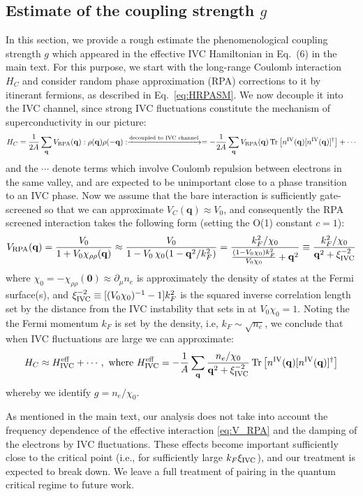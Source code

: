 \documentclass[aps,pra,twocolumn,superscriptaddress,10pt,article,nofootinbib,showpacs,longbibliography]{revtex4-1}
\def \q{{\mathbf q}}
\def \beq{\begin{eqnarray}}
\def \eeq{\end{eqnarray}}
\begin{document}
\subsection{Estimate of the coupling strength $g$}
In this section, we provide a rough estimate the phenomenological coupling strength $g$ which appeared in the effective IVC Hamiltonian in Eq.~(6) in the main text.
For this purpose, we start with the long-range Coulomb interaction $H_C$ and consider random phase approximation (RPA) corrections to it by itinerant fermions, as described in Eq.~\eqref{eq:HRPASM}.
We now decouple it into the IVC channel, since strong IVC fluctuations constitute the mechanism of superconductivity in our picture:
\beq
H_{C} = \frac{1}{2A} \sum_\q V_{\rm RPA}(\q) :\rho(\q) \rho(-\q):  \xrightarrow{\text{decoupled to IVC channel}}  = -\frac{1}{2A} \sum_\q V_{\rm RPA}(\q)  \Tr\left[ n^{\rm IV}(\q) [n^{\rm IV}(\q)]^\dagger \right] + \cdots
\eeq
and the $\cdots$ denote terms which involve Coulomb repulsion between electrons in the same valley, and are expected to be unimportant close to a phase transition to an IVC phase. 
Now we assume that the bare interaction is sufficiently gate-screened so that we can approximate $V_C(\q) \approx V_0$, and consequently the RPA screened interaction takes the following form (setting the O(1) constant $c=1$):
\beq
V_{\rm RPA}(\q)= \frac{V_0}{1 + V_0 \chi_{\rho \rho}(\q)} \approx \frac{V_0}{1 - V_0 \, \chi_0(1 - \q^2/k_F^2)} = \frac{k_F^2/\chi_0}{\frac{(1 - V_0 \chi_0)k_F^2}{V_0 \chi_0} + \q^2} \equiv \frac{k_F^2/\chi_0}{\q^2 + \xi_{\rm{IVC}}^{-2}}
\label{eq:V_RPA}
\eeq
where $\chi_0 = - \chi_{\rho \rho}(\bm{0}) \approx \partial_\mu n_e$ is approximately the density of states at the Fermi surface(s), and  $\xi_{\rm{IVC}}^{-2} \equiv [(V_0 \chi_0)^{-1} - 1]k_F^2$ is the squared inverse correlation length set by the distance from the IVC instability that sets in at $V_0 \chi_0 = 1$.
Noting the the Fermi momentum $k_F$ is set by the density, i.e, $k_F \sim \sqrt{n_e}$, we conclude that when IVC fluctuations are large we can approximate:
\beq
H_{C} \approx H^{\rm eff}_{\rm IVC} + \cdots, \text{ where }  H^{\rm eff}_{\rm IVC} = - \frac{1}{A} \sum_\q \frac{n_e/\chi_0}{\q^2 + \xi_{\rm{IVC}}^{-2}}  \Tr\left[ n^{\rm IV}(\q) [n^{\rm IV}(\q)]^\dagger \right]
\eeq
whereby we identify $g = n_e/\chi_0$.

As mentioned in the main text, our analysis does not take into account the frequency dependence of the effective interaction \eqref{eq:V_RPA} and the damping of the electrons by IVC fluctuations. These effects become important sufficiently close to the critical point \cite{abanov2001coherent} (i.e., for sufficiently large $k_F\xi_{\rm{IVC}}$), and our treatment is expected to break down. We leave a full treatment of pairing in the quantum critical regime to future work.
\end{document}
